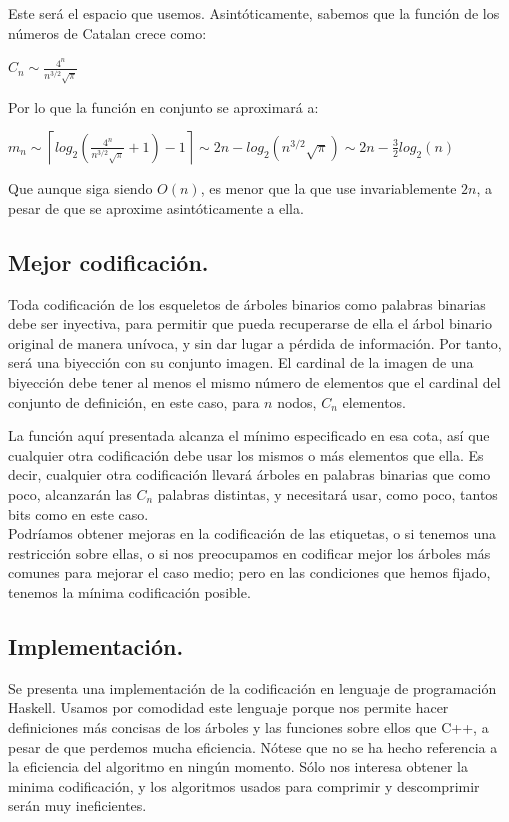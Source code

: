 \documentclass{article}
\begin{document}
Este será el espacio que usemos. Asintóticamente, sabemos que la función de los números de Catalan crece como:
\begin{adjustwidth}{2cm}{}
 $\displaystyle C_n \sim \frac{4^n}{n^{3/2}\sqrt\pi}$
\end{adjustwidth}
Por lo que la función en conjunto se aproximará a:
\begin{adjustwidth}{2cm}{}
 $\displaystyle m_n \sim \left\lceil log_2 \left( \frac{4^n}{n^{3/2}\sqrt\pi} + 1 \right) - 1 \right\rceil \sim 2n - log_2\left(n^{3/2}\sqrt\pi\right) \sim 2n - \frac{3}{2}log_2(n)$
\end{adjustwidth}
Que aunque siga siendo $O(n)$, es menor que la que use invariablemente $2n$, a pesar de que se aproxime asintóticamente a ella.

\subsection {Mejor codificación.}

Toda codificación de los esqueletos de árboles binarios como palabras binarias debe ser inyectiva, para permitir que pueda recuperarse de ella el árbol binario original de manera unívoca, y
sin dar lugar a pérdida de información. Por tanto, será una biyección con su conjunto imagen. El cardinal de la imagen de una biyección debe tener al menos el mismo número de elementos
que el cardinal del conjunto de definición, en este caso, para $n$ nodos, $C_n$ elementos.

La función aquí presentada alcanza el mínimo especificado en esa cota, así que cualquier otra codificación debe usar los mismos o más elementos que ella. Es decir, cualquier otra
codificación llevará árboles en palabras binarias que como poco, alcanzarán las $C_n$ palabras distintas, y necesitará usar, como poco, tantos bits como en este caso.\\

Podríamos obtener mejoras en la codificación de las etiquetas, o si tenemos una restricción sobre ellas, o si nos preocupamos en codificar mejor los árboles más comunes para mejorar el caso medio;
pero en las condiciones que hemos fijado, tenemos la mínima codificación posible.


\subsection {Implementación.}

Se presenta una implementación de la codificación en lenguaje de programación Haskell. Usamos por comodidad este lenguaje porque nos permite hacer definiciones más
concisas de los árboles y las funciones sobre ellos que C++, a pesar de que perdemos mucha eficiencia. Nótese que no se ha hecho referencia a la eficiencia del algoritmo en
ningún momento. Sólo nos interesa obtener la minima codificación, y los algoritmos usados para comprimir y descomprimir serán muy ineficientes.\\
\end{document}
